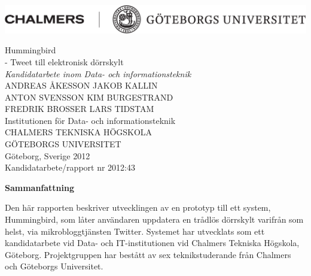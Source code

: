 \documentclass[a4paper,11pt]{article}
\begin{document}
\centerline{\includegraphics[scale=0.75, angle=0]{ChaGUsvartHD.png}}
\vspace{1.7cm}

\begin{flushleft}
\null
\vfill
{\huge Hummingbird} \\
	{\LARGE- Tweet till elektronisk dörrskylt}\\ [0.1cm]

\emph{\large{Kandidatarbete inom Data- och informationsteknik}} \\ [0.8cm]

{\Large ANDREAS ÅKESSON} \hspace{1cm} {\Large JAKOB KALLIN} \\ [0.1cm]
{\Large ANTON SVENSSON} \hspace{1.35cm} {\Large KIM BURGESTRAND} \\ [0.1cm]
{\Large FREDRIK BROSSER} \hspace{1.2cm} {\Large LARS TIDSTAM} \\ [0.9cm]


{\large Institutionen för Data- och informationsteknik} \\ [.3cm]
   {\large CHALMERS TEKNISKA HÖGSKOLA} \\
   {\large GÖTEBORGS UNIVERSITET} \\
  {\large Göteborg, Sverige 2012} \\
   {\large Kandidatarbete/rapport nr 2012:43} \\

\end{flushleft}	
\thispagestyle{empty}
\pagebreak

\thispagestyle{empty}
\begin{center}
{\noindent \bf Sammanfattning}\\
\end{center}

Den här rapporten beskriver utvecklingen av en prototyp till ett system, Hummingbird, som låter användaren uppdatera en trådlös dörrskylt varifrån som helst, via mikrobloggtjänsten Twitter. Systemet har utvecklats som ett kandidatarbete vid Data- och IT-institutionen vid Chalmers Tekniska Högskola, Göteborg. Projektgruppen har bestått av sex teknikstuderande från Chalmers och Göteborgs Universitet.\\
\end{document}
